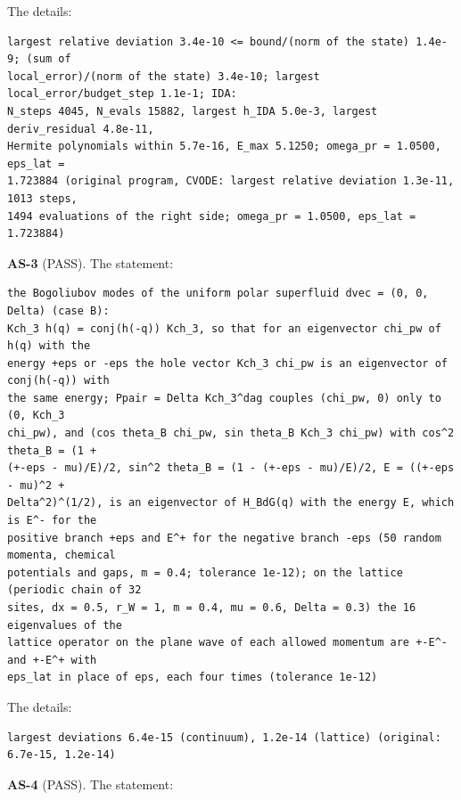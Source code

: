 \documentclass[
  10pt,
]{article}
\begin{document}
The details:

\begin{verbatim}
largest relative deviation 3.4e-10 <= bound/(norm of the state) 1.4e-9; (sum of
local_error)/(norm of the state) 3.4e-10; largest local_error/budget_step 1.1e-1; IDA:
N_steps 4045, N_evals 15882, largest h_IDA 5.0e-3, largest deriv_residual 4.8e-11,
Hermite polynomials within 5.7e-16, E_max 5.1250; omega_pr = 1.0500, eps_lat =
1.723884 (original program, CVODE: largest relative deviation 1.3e-11, 1013 steps,
1494 evaluations of the right side; omega_pr = 1.0500, eps_lat = 1.723884)
\end{verbatim}

\textbf{AS-3} (PASS). The statement:

\begin{verbatim}
the Bogoliubov modes of the uniform polar superfluid dvec = (0, 0, Delta) (case B):
Kch_3 h(q) = conj(h(-q)) Kch_3, so that for an eigenvector chi_pw of h(q) with the
energy +eps or -eps the hole vector Kch_3 chi_pw is an eigenvector of conj(h(-q)) with
the same energy; Ppair = Delta Kch_3^dag couples (chi_pw, 0) only to (0, Kch_3
chi_pw), and (cos theta_B chi_pw, sin theta_B Kch_3 chi_pw) with cos^2 theta_B = (1 +
(+-eps - mu)/E)/2, sin^2 theta_B = (1 - (+-eps - mu)/E)/2, E = ((+-eps - mu)^2 +
Delta^2)^(1/2), is an eigenvector of H_BdG(q) with the energy E, which is E^- for the
positive branch +eps and E^+ for the negative branch -eps (50 random momenta, chemical
potentials and gaps, m = 0.4; tolerance 1e-12); on the lattice (periodic chain of 32
sites, dx = 0.5, r_W = 1, m = 0.4, mu = 0.6, Delta = 0.3) the 16 eigenvalues of the
lattice operator on the plane wave of each allowed momentum are +-E^- and +-E^+ with
eps_lat in place of eps, each four times (tolerance 1e-12)
\end{verbatim}

The details:

\begin{verbatim}
largest deviations 6.4e-15 (continuum), 1.2e-14 (lattice) (original: 6.7e-15, 1.2e-14)
\end{verbatim}

\textbf{AS-4} (PASS). The statement:
\end{document}

